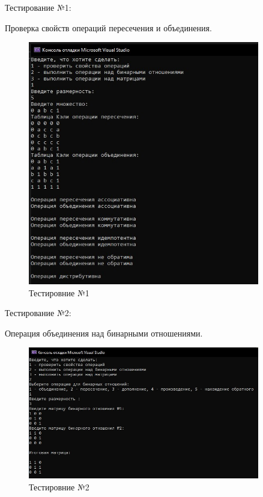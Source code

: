\documentclass[bachelor, och, labwork]{shiza}
\begin{document}
	Тестирование №1:
	
Проверка свойств операций пересечения и объединения.

	\begin{figure}[H]
		\centering
		\includegraphics[width=0.9\textwidth]{test_1}
		\caption{Тестировние №1}
		\label{fig:test_1}
	\end{figure}
	
	Тестирование №2:
	
Операция объединения над бинарными отношениями.
	
	\begin{figure}[H]
		\centering
		\includegraphics[width=0.9\textwidth]{test_2}
		\caption{Тестировние №2}
		\label{fig:test_2}
	\end{figure}
	
\end{document}
